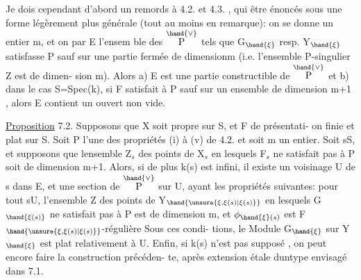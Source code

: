 
Je dois cependant d'abord  un remords à 4.2. et 4.3. , qui
 être énoncés sous une forme légèrement plus générale (tout au
moins en remarque): on se donne un entier m, et on  par E l'ensem
ble des \hand{$\xi\in$}$\overset{\hand{\vee}}{\text{P}}$ tels que G$_{\hand{\xi}}$ resp. Y$_{\hand{\xi}}$ satisfasse P sauf  sur une
partie fermée de dimension\hand{$\leq$}m (i.e. l'ensemble P-singulier Z est de dimen-%
sion\hand{$\leq$} m). Alors a) E est une partie constructible de $\overset{\hand{\vee}}{\text{P}}$ et b) dans le
cas S=Spec(k), si F  satisfait à P sauf  sur un ensemble de
dimension\hand{$\leq$} m+1 , alors E contient un ouvert non vide.

\uline{Proposition} 7.2. Supposons que X soit propre sur S, et F de présentati-%
on finie et plat sur S. Soit P l'une des propriétés (i) à (v) de 4.2.
et soit m un entier. Soit s\hand{$\in$}S, et supposons que 
 lensemble Z$_s$ des points de X$_s$ en lesquels F$_s$ ne satisfait
pas à P soit de dimension \hand{$\leq$} m+1. Alors, si de plus k(s) est infini, il
existe un voisinage U de s dans E, et une section \hand{$\xi$} de $\overset{\hand{\vee}}{\text{P}}$ sur U, ayant
les propriétés suivantes: pour tout s\hand{$\in$}U, l'ensemble Z des points
de  Y$_{\hand{\unsure{\xi,\xi(s)|\xi(s)}}}$ en lesquels G$_{\hand{\xi(s)}}$ ne satisfait pas à P est de dimension
\hand{$\leq$}m, et $\phi_{\hand{\xi}(s)}$ est F$_{\hand{\unsure{\xi,\xi(s)|\xi(s)}}}$-régulière\hand{,}  Sous ces condi-%
tions, le Module G$_{\hand{\xi}}$ sur Y$_{\hand{\xi}}$ est plat relativement à U. Enfin, si k(s)
n'est pas supposé , on peut encore faire la construction précéden-%
te, après extension étale duntype envisagé dans 7.1.

